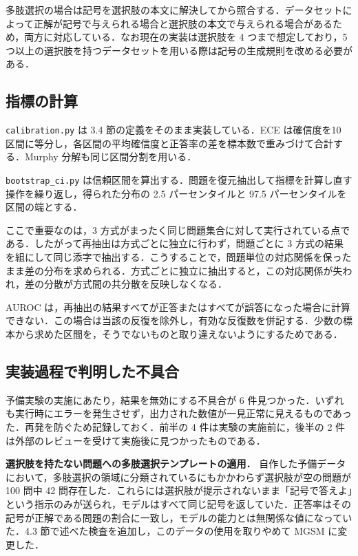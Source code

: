多肢選択の場合は記号を選択肢の本文に解決してから照合する．データセットによって正解が記号で与えられる場合と選択肢の本文で与えられる場合があるため，両方に対応している．なお現在の実装は選択肢を 4 つまで想定しており，5 つ以上の選択肢を持つデータセットを用いる際は記号の生成規則を改める必要がある．

\subsection{指標の計算}

\texttt{calibration.\allowbreak{}py} は 3.4 節の定義をそのまま実装している．ECE は確信度を10 区間に等分し，各区間の平均確信度と正答率の差を標本数で重みづけて合計する．Murphy 分解も同じ区間分割を用いる．

\texttt{bootstrap\_\allowbreak{}ci.\allowbreak{}py} は信頼区間を算出する．問題を復元抽出して指標を計算し直す操作を繰り返し，得られた分布の 2.5 パーセンタイルと 97.5 パーセンタイルを区間の端とする．

ここで重要なのは，3 方式がまったく同じ問題集合に対して実行されている点である．したがって再抽出は方式ごとに独立に行わず，問題ごとに 3 方式の結果を組にして同じ添字で抽出する．こうすることで，問題単位の対応関係を保ったまま差の分布を求められる．方式ごとに独立に抽出すると，この対応関係が失われ，差の分散が方式間の共分散を反映しなくなる．

AUROC は，再抽出の結果すべてが正答またはすべてが誤答になった場合に計算できない．この場合は当該の反復を除外し，有効な反復数を併記する．少数の標本から求めた区間を，そうでないものと取り違えないようにするためである．

\subsection{実装過程で判明した不具合}

予備実験の実施にあたり，結果を無効にする不具合が 6 件見つかった．いずれも実行時にエラーを発生させず，出力された数値が一見正常に見えるものであった．再発を防ぐため記録しておく．前半の 4 件は実験の実施前に，後半の 2 件は外部のレビューを受けて実施後に見つかったものである．

\textbf{選択肢を持たない問題への多肢選択テンプレートの適用．} 自作した予備データにおいて，多肢選択の領域に分類されているにもかかわらず選択肢が空の問題が100 問中 42 問存在した．これらには選択肢が提示されないまま「記号で答えよ」という指示のみが送られ，モデルはすべて同じ記号を返していた．正答率はその記号が正解である問題の割合に一致し，モデルの能力とは無関係な値になっていた．4.3 節で述べた検査を追加し，このデータの使用を取りやめて MGSM に変更した．

